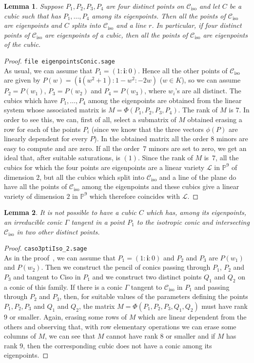 \documentclass{amsart}
\theoremstyle{plain}
\newtheorem{lemma}{Lemma}[section]
\theoremstyle{definition}
\newcommand{\iso}{\mathcal{C}_{\mathrm{iso}}}
\newcommand{\iii}{\textbf{i}}
\begin{document}
\begin{lemma}
\label{lemma:fourOnIso}
Suppose $P_1, P_2, P_3, P_4$ are four distinct points on $\iso$ and let
$C$ be a cubic such that has $P_1, \dots, P_4$ among its eigenpoints.
Then all the points of $\iso$ are eigenpoints and $C$ splits into $\iso$
and a line $r$. In particular, if four
distinct points of $\iso$ are eigenpoints of a cubic, then all the
points of $\iso$ are eigenpoints of the cubic.
\end{lemma}
\begin{proof}
\verb+file eigenpointsConic.sage+\\
As usual, we can assume that $P_1 = (1: \iii: 0)$. Hence all the other points
of $\iso$ are given by
$P(w) = (\iii(w^2 + 1): 1 - w^2: -2w)$ ($w\in K$), so we can assume
$P_2 = P(w_1)$, $P_3 = P(w_2)$ and $P_4 = P(w_3)$, where $w_i$'s are
all distinct. The cubics which have $P_1, \dots, P_4$ among the eigenpoints
are obtained from the linear system whose associated matrix is
$M = \Phi(P_1, P_2, P_3, P_4)$. The rank of $M$ is $7$. In order to see this,
we can, first of all, select a submatrix of $M$ obtained erasing a
row for each of the points $P_i$ (since we know that the three vectors
$\phi(P)$ are linearly dependent for every $P$). In the obtained matrix
all the order $8$ minors are easy to compute and are zero.
If all the order~$7$
minors are set to zero, we get an ideal that, after suitable saturations,
is $(1)$. Since the rank of $M$ is~$7$, all the cubics for which the
four points are eigenpoints are a linear variety $\mathcal{L}$
in $\mathbb{P}^9$
of dimension $2$, but all the cubics which split into $\iso$ and a line
of the plane do have all the points of $\iso$ among the eigenpoints and
these cubics give a linear variety of dimension $2$ in $\mathbb{P}^9$
which therefore coincides with $\mathcal{L}$.
\end{proof}

\begin{lemma}
\label{lemma3ptiSuCiso}
It is not possible to have a cubic $C$ which has, among its eigenpoints,
an irreducible conic $\Gamma$ tangent in a point $P_1$ to the isotropic
conic and intersecting $\iso$ in two other distinct points.
\end{lemma}
\begin{proof}
\verb+caso3ptiIso_2.sage+\\
As in the proof~, we can assume that
$P_1 = (1: \iii: 0)$
and $P_2$ and $P_3$ are $P(w_1)$ and $P(w_2)$. Then we construct
the pencil of conics passing through $P_1$, $P_2$ and $P_3$ and
tangent to Ciso in $P_1$ and we construct two distinct points
$Q_1$ and $Q_2$ on a conic of this family. If there is a conic $\Gamma$
tangent to $\iso$ in $P_1$ and passing through $P_2$ and $P_3$,
then, for suitable values of the parameters defining the points
$P_1, P_2, P_3$ and $Q_1$ and $Q_2$, the matrix
$M = \Phi(P_1, P_2, P_3, Q_1, Q_2)$
must have rank $9$ or smaller. Again, erasing some rows of $M$
which are linear dependent from the others and observing that,
with row elementary operations we can erase some columns of $M$,
we can see that $M$ cannot have rank $8$ or smaller and if $M$
has rank $9$, then the corresponding cubic does not have a conic
among its eigenpoints.
\end{proof}
\end{document}
